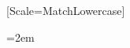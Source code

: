 
\usepackage{microtype}

\usepackage{newunicodechar}
\newfontfamily{}[Scale=MatchLowercase]
\linespread{1.05}

\setlength{\parindent}{1.2em}
\setlength{\parskip}{0em}

\raggedbottom
\emergencystretch=2em

